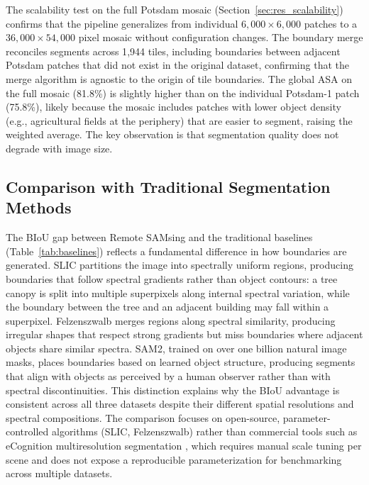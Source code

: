 \documentclass[review,11pt,authoryear]{elsarticle}
\begin{document}
The scalability test on the full Potsdam mosaic (Section~\ref{sec:res_scalability}) confirms that the pipeline generalizes from individual $6{,}000 \times 6{,}000$ patches to a $36{,}000 \times 54{,}000$ pixel mosaic without configuration changes. The boundary merge reconciles segments across 1{,}944 tiles, including boundaries between adjacent Potsdam patches that did not exist in the original dataset, confirming that the merge algorithm is agnostic to the origin of tile boundaries. The global ASA on the full mosaic (81.8\%) is slightly higher than on the individual Potsdam-1 patch (75.8\%), likely because the mosaic includes patches with lower object density (e.g., agricultural fields at the periphery) that are easier to segment, raising the weighted average. The key observation is that segmentation quality does not degrade with image size.

\subsection{Comparison with Traditional Segmentation Methods}
\label{sec:disc_baselines}

The BIoU gap between Remote SAMsing and the traditional baselines (Table~\ref{tab:baselines}) reflects a fundamental difference in how boundaries are generated. SLIC partitions the image into spectrally uniform regions, producing boundaries that follow spectral gradients rather than object contours: a tree canopy is split into multiple superpixels along internal spectral variation, while the boundary between the tree and an adjacent building may fall within a superpixel. Felzenszwalb merges regions along spectral similarity, producing irregular shapes that respect strong gradients but miss boundaries where adjacent objects share similar spectra. SAM2, trained on over one billion natural image masks, places boundaries based on learned object structure, producing segments that align with objects as perceived by a human observer rather than with spectral discontinuities. This distinction explains why the BIoU advantage is consistent across all three datasets despite their different spatial resolutions and spectral compositions. The comparison focuses on open-source, parameter-controlled algorithms (SLIC, Felzenszwalb) rather than commercial tools such as eCognition multiresolution segmentation \citep{baatz2000multiresolution}, which requires manual scale tuning per scene and does not expose a reproducible parameterization for benchmarking across multiple datasets.
\end{document}
